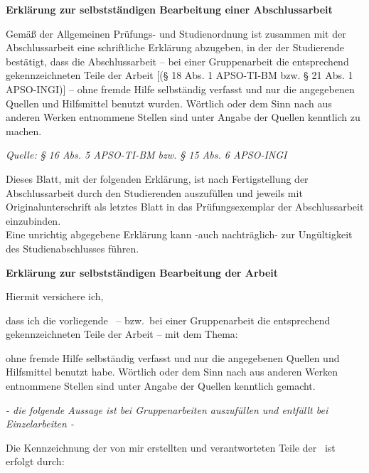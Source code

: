 \clearpage
\textbf{\sffamily\large Erklärung zur selbstständigen Bearbeitung einer Abschlussarbeit}

{\footnotesize
Gemäß der Allgemeinen Prüfungs- und Studienordnung ist zusammen mit der Abschlussarbeit eine schriftliche Erklärung abzugeben, in der der Studierende bestätigt, dass die Abschlussarbeit \glqq– bei einer Gruppenarbeit die entsprechend gekennzeichneten Teile der Arbeit [(§ 18 Abs. 1 APSO-TI-BM bzw. § 21 Abs. 1 APSO-INGI)] – ohne fremde Hilfe selbständig verfasst und nur die angegebenen Quellen und Hilfsmittel benutzt wurden. Wörtlich oder dem Sinn nach aus anderen Werken entnommene Stellen sind unter Angabe der Quellen kenntlich zu machen.\grqq
}

\hfill {\em\footnotesize Quelle: § 16 Abs. 5 APSO-TI-BM bzw. § 15 Abs. 6 APSO-INGI}

{\footnotesize
Dieses Blatt, mit der folgenden Erklärung, ist nach Fertigstellung der Abschlussarbeit durch den Studierenden auszufüllen und jeweils mit Originalunterschrift als letztes Blatt in das Prüfungsexemplar der Abschlussarbeit einzubinden.\\
Eine unrichtig abgegebene Erklärung kann -auch nachträglich- zur Ungültigkeit des Studienabschlusses führen.
}


\vspace{1cm}
\textbf{\sffamily Erklärung zur selbstständigen Bearbeitung der Arbeit}

Hiermit versichere ich,
\par\noindent{}    \makebox[8cm]{\hrulefill}
\par\noindent{} \makebox[8cm]{\hrulefill}

dass ich die vorliegende \IthesisKind\ -- bzw.\ bei einer Gruppenarbeit die entsprechend gekennzeichneten Teile der Arbeit -- mit dem Thema:

\textbf{\IthesisTitle}

ohne fremde Hilfe selbständig verfasst und nur die angegebenen Quellen und Hilfsmittel benutzt habe.
Wörtlich oder dem Sinn nach aus anderen Werken entnommene Stellen sind unter Angabe der Quellen kenntlich gemacht.

\begin{center}
  \emph{\footnotesize- die folgende Aussage ist bei Gruppenarbeiten auszufüllen und entfällt bei Einzelarbeiten -}
\end{center}

Die Kennzeichnung der von mir erstellten und verantworteten Teile der \IthesisKind\ ist erfolgt durch:

\vspace{1.5cm}

\vspace{1cm}
\noindent\makebox[3cm]{\hrulefill} \hspace{0.1cm}
    \makebox[3cm]{\hrulefill} \hspace{0.1cm}
    \makebox[6cm]{\hrulefill} \\
\noindent{} \hspace{0.1cm}
     \hspace{0.1cm}

\clearpage
